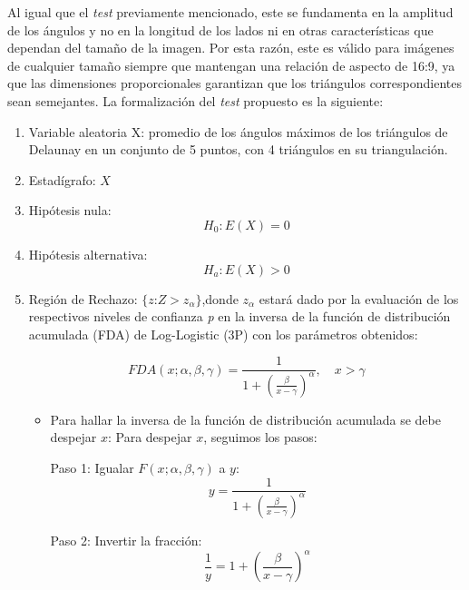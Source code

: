 \documentclass[12pt]{report}
\begin{document}
Al igual que el \textit{test} previamente mencionado, este se fundamenta en la amplitud de los ángulos y no en la longitud de los lados ni en otras características que dependan del tamaño de la imagen. Por esta razón, este es válido para imágenes de cualquier tamaño siempre que mantengan una relación de aspecto de 16:9, ya que las dimensiones proporcionales garantizan que los triángulos correspondientes sean semejantes. La formalización del \textit{test} propuesto es la siguiente:
\begin{enumerate}
	\item Variable aleatoria X: promedio de los ángulos máximos de los triángulos de Delaunay en un conjunto de 5 puntos, con 4 triángulos en su triangulación.
	\item Estadígrafo: $X$
	
	\item Hipótesis nula: \[H_0:E(X)=0\]
	
	
	\item Hipótesis alternativa: \[H_a:E(X)>0\]
	
	\item  Región de Rechazo: $\{z$:$Z>z_\alpha\}$,donde  $z_\alpha$ estará dado por la evaluación de los respectivos niveles de confianza \textit{p} en la  inversa de la función de distribución acumulada (FDA) de Log-Logistic (3P) con los parámetros obtenidos: 
	
	\[
	FDA(x; \alpha, \beta, \gamma) = \frac{1}{1 + \left( \frac{\beta}{x - \gamma} \right)^\alpha}, \quad x > \gamma
	\]
	\begin{itemize}
		\item  Para hallar la inversa de la función de distribución acumulada se debe despejar $x$:
		Para despejar \( x \), seguimos los pasos:
		
		Paso 1: Igualar \( F(x; \alpha, \beta, \gamma) \) a \( y \):
		\[
		y = \frac{1}{1 + \left( \frac{\beta}{x - \gamma} \right)^\alpha}
		\]
		
		Paso 2: Invertir la fracción:
		\[
		\frac{1}{y} = 1 + \left( \frac{\beta}{x - \gamma} \right)^\alpha
		\]
		

\end{itemize}
\end{enumerate}
\end{document}
